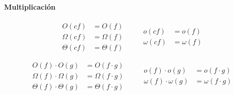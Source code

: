 \paragraph{Multiplicación}
  \[
  \begin{aligned}
      O(cf) &= O(f)\\
      \Omega(cf) &= \Omega(f)\\
      \Theta(cf) &= \Theta(f)
  \end{aligned}
  \qquad
  \begin{aligned}
      o(cf) &= o(f)\\
      \omega(cf) &= \omega(f)
  \end{aligned}
  \]

  \[
  \begin{aligned}
      O(f)\cdot O(g) &= O(f\cdot g)\\
      \Omega(f)\cdot\Omega(g) &= \Omega(f\cdot g)\\
      \Theta(f)\cdot\Theta(g) &= \Theta(f\cdot g)
  \end{aligned}
  \qquad
  \begin{aligned}
      o(f)\cdot o(g) &= o(f\cdot g)\\
      \omega(f)\cdot\omega(g) &= \omega(f\cdot g)
  \end{aligned}
  \]

